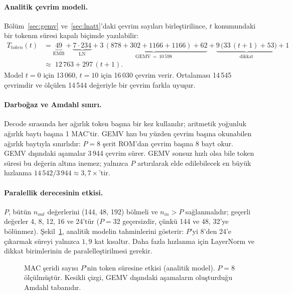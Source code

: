 \paragraph{Analitik çevrim modeli.} Bölüm~\ref{sec:gemv} ve~\ref{sec:lnatt}'daki çevrim sayıları birleştirilince, $t$ konumundaki bir tokenın süresi kapalı biçimde yazılabilir:
\begin{equation}
\begin{aligned}
  T_{token}(t) &= \underbrace{49}_{\mathrm{EMB}} + \underbrace{7\cdot234}_{\mathrm{LN}} + \underbrace{3\,(878+302+1166+1166)+62}_{\mathrm{GEMV}\,=\,10\,598} + \underbrace{9\,\big(33\,(t+1) + 53\big)}_{\text{dikkat}} + 1 \\
  &\approx\; 12\,763 + 297\,(t+1).
\end{aligned}
\end{equation}
Model $t=0$ için 13\,060, $t=10$ için 16\,030 çevrim verir. Ortalaması 14\,545 çevrimdir ve ölçülen 14\,544 değeriyle bir çevrim farkla uyuşur.

\paragraph{Darboğaz ve Amdahl sınırı.} Decode sırasında her ağırlık token başına bir kez kullanılır; aritmetik yoğunluk ağırlık baytı başına 1 MAC'tir. GEMV hızı bu yüzden çevrim başına okunabilen ağırlık baytıyla sınırlıdır: $P=8$ şerit ROM'dan çevrim başına 8 bayt okur. GEMV dışındaki aşamalar 3\,944 çevrim sürer. GEMV sonsuz hızlı olsa bile token süresi bu değerin altına inemez; yalnızca $P$ artırılarak elde edilebilecek en büyük hızlanma $14\,542/3\,944 \approx 3{,}7\times$'tir.

\paragraph{Paralellik derecesinin etkisi.} $P$, bütün $n_{out}$ değerlerini (144, 48, 192) bölmeli ve $n_{in} > P$ sağlanmalıdır; geçerli değerler 4, 8, 12, 16 ve 24'tür ($P=32$ geçersizdir, çünkü 144 ve 48, 32'ye bölünmez). Şekil~\ref{fig:ptarama}, analitik modelin tahminlerini gösterir: $P$'yi 8'den 24'e çıkarmak süreyi yalnızca $1{,}9$ kat kısaltır. Daha fazla hızlanma için LayerNorm ve dikkat birimlerinin de paralelleştirilmesi gerekir.

\begin{figure}[h]
  \centering
  \caption[Paralellik derecesinin etkisi]{MAC şeridi sayısı $P$'nin token süresine etkisi (analitik model). $P=8$ ölçülmüştür. Kesikli çizgi, GEMV dışındaki aşamaların oluşturduğu Amdahl tabanıdır.}
  \label{fig:ptarama}
\end{figure}

